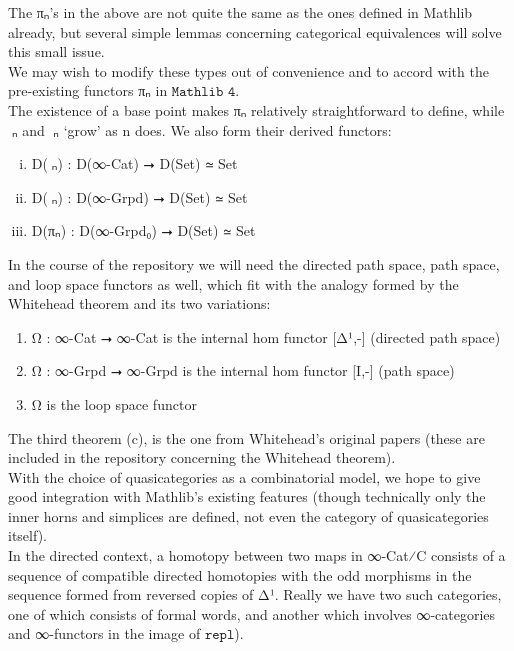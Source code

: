 \documentclass{book}
\theoremstyle{definition}
\begin{document}
The πₙ's in the above are not quite the same as the ones defined in Mathlib already, but several simple lemmas concerning categorical equivalences will solve this small issue.\\

We may wish to modify these types out of convenience and to accord with the pre-existing functors πₙ in $\texttt{Mathlib 4}$.\\

The existence of a base point makes πₙ relatively straightforward to define, while π⃗ₙ and π⃡ₙ `grow' as n does. We also form their derived functors:

\begin{enumerate}[(i)]
\item D(π⃗ₙ) : D(∞-Cat) ⭢ D(Set) ≃ Set
\item D(π⃡ₙ) : D(∞-Grpd) ⭢ D(Set) ≃ Set
\item D(πₙ) : D(∞-Grpd₀) ⭢ D(Set) ≃ Set
\end{enumerate}

In the course of the repository we will need the directed path space, path space, and loop space functors as well, which fit with the analogy formed by the Whitehead theorem and its two variations:

\begin{enumerate}
\item Ω⃗ : ∞-Cat ⭢ ∞-Cat is the internal hom functor [Δ¹,-] (directed path space)
\item Ω⃡ : ∞-Grpd ⭢ ∞-Grpd is the internal hom functor [I,-] (path space)
\item Ω is the loop space functor
\end{enumerate}

The third theorem (c), is the one from Whitehead's original papers (these are included in the repository concerning the Whitehead theorem).\\

With the choice of quasicategories as a combinatorial model, we hope to give good integration with Mathlib's existing features (though technically only the inner horns and simplices are defined, not even the category of quasicategories itself).\\

In the directed context, a homotopy between two maps in ∞-Cat⁄C consists of a sequence of compatible directed homotopies with the odd morphisms in the sequence formed from reversed copies of Δ¹. Really we have two such categories, one of which consists of formal words, and another which involves ∞-categories and ∞-functors in the image of $\texttt{repl}$).\\
\end{document}
